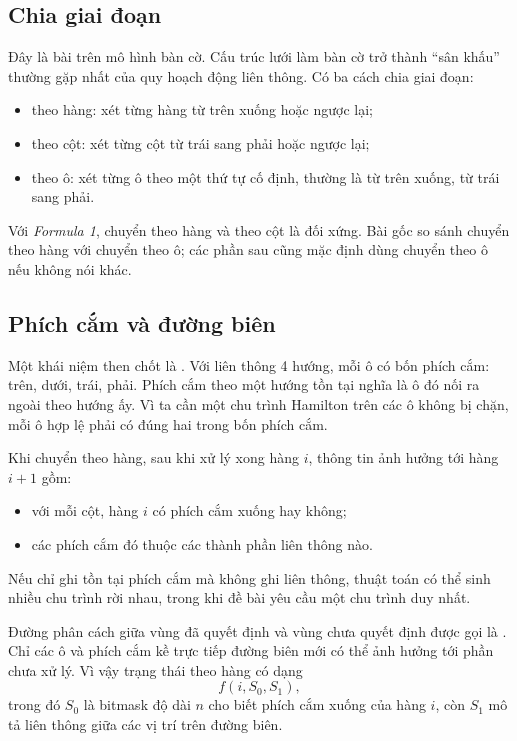 \documentclass[11pt]{article}
\begin{document}
\subsection{Chia giai đoạn}

Đây là bài trên mô hình bàn cờ. Cấu trúc lưới làm bàn cờ trở thành ``sân
khấu'' thường gặp nhất của quy hoạch động liên thông. Có ba cách chia giai
đoạn:
\begin{itemize}
  \item theo hàng: xét từng hàng từ trên xuống hoặc ngược lại;
  \item theo cột: xét từng cột từ trái sang phải hoặc ngược lại;
  \item theo ô: xét từng ô theo một thứ tự cố định, thường là từ trên xuống,
  từ trái sang phải.
\end{itemize}

Với \textit{Formula 1}, chuyển theo hàng và theo cột là đối xứng. Bài gốc so
sánh chuyển theo hàng với chuyển theo ô; các phần sau cũng mặc định dùng chuyển
theo ô nếu không nói khác.

\subsection{Phích cắm và đường biên}

Một khái niệm then chốt là . Với liên thông 4 hướng, mỗi ô có
bốn phích cắm: trên, dưới, trái, phải. Phích cắm theo một hướng tồn tại nghĩa
là ô đó nối ra ngoài theo hướng ấy. Vì ta cần một chu trình Hamilton trên các
ô không bị chặn, mỗi ô hợp lệ phải có đúng hai trong bốn phích cắm.

Khi chuyển theo hàng, sau khi xử lý xong hàng \(i\), thông tin ảnh hưởng tới
hàng \(i+1\) gồm:
\begin{itemize}
  \item với mỗi cột, hàng \(i\) có phích cắm xuống hay không;
  \item các phích cắm đó thuộc các thành phần liên thông nào.
\end{itemize}
Nếu chỉ ghi tồn tại phích cắm mà không ghi liên thông, thuật toán có thể sinh
nhiều chu trình rời nhau, trong khi đề bài yêu cầu một chu trình duy nhất.

Đường phân cách giữa vùng đã quyết định và vùng chưa quyết định được gọi là
. Chỉ các ô và phích cắm kề trực tiếp đường biên mới có thể
ảnh hưởng tới phần chưa xử lý. Vì vậy trạng thái theo hàng có dạng
\[
  f(i,S_0,S_1),
\]
trong đó \(S_0\) là bitmask độ dài \(n\) cho biết phích cắm xuống của hàng
\(i\), còn \(S_1\) mô tả liên thông giữa các vị trí trên đường biên.
\end{document}
